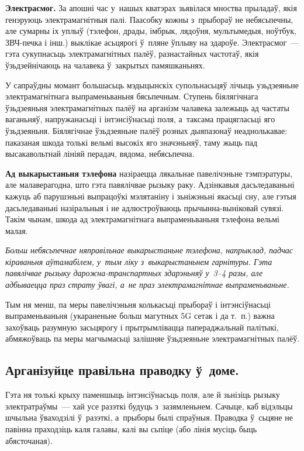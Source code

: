 \textbf{Электрасмог.} За апошні час у~нашых кватэрах зьявілася мноства прыладаў, якія генэруюць электрамагнітныя палі. Паасобку кожны з~прыбораў не небясьпечны, але сумарны іх уплыў (тэлефон, драды, імбрык, лядоўня, мультымедыя, ноўтбук, ЗВЧ-печка і інш.) выклікае асьцярогі ў~пляне ўплыву на здароўе. Электрасмог~--- гэта сукупнасьць электрамагнітных палёў, разнастайных частотаў, якія ўзьдзейнічаюць на чалавека ў~закрытых памяшканьнях.

У сапраўдны момант большасьць мэдыцынскіх супольнасьцяў лічыць узьдзеяньне электрамагнітнага выпраменьваньня бясьпечным. Ступень біялягічнага ўзьдзеяньня электрамагнітных палёў на арганізм чалавека залежыць ад частаты ваганьняў, напружанасьці і інтэнсіўнасьці поля, а~таксама працягласьці яго ўзьдзеяньня. Біялягічнае ўзьдзеяньне палёў розных дыяпазонаў неаднолькавае: паказаная шкода толькі вельмі высокіх яго значэньняў, таму жыць пад высакавольтнай лініяй перадач, вядома, небясьпечна.

\textbf{Ад выкарыстаньня тэлефона} назіраецца лякальнае павелічэньне тэмпэратуры, але малаверагодна, што гэта павялічвае рызыку раку. Адзінкавыя дасьледаваньні кажуць аб парушэньні выпрацоўкі мэлятаніну і зьніжэньні якасьці сну, але гэтыя дасьледаваньні назіральныя і не адлюстроўваюць прычынна-выніковай сувязі. Такім чынам, шкода ад электрамагнітнага выпраменьваньня тэлефона вельмі малая. 

\emph{Больш небясьпечнае няправільнае выкарыстаньне тэлефона, напрыклад, падчас кіраваньня аўтамабілем, у~тым ліку з~выкарыстаньнем гарнітуры. Гэта павялічвае рызыку дарожна-транспартных здарэньняў у~3--4 разы, але адбываецца праз страту ўвагі, а~не праз электрамагнітнае выпраменьваньне.}

Тым ня менш, па меры павелічэньня колькасьці прыбораў і інтэнсіўнасьці выпраменьваньня (укараненьне больш магутных 5G сетак і да т.~п.) важна захоўваць разумную засьцярогу і прытрымлівацца папераджальнай палітыкі, абмяжоўваць па меры магчымасьці залішняе ўзьдзеяньне электрамагнітных палёў.

\subsection*{Арганізуйце правільна праводку ў~доме.}

Гэта ня толькі крыху паменшыць інтэнсіўнасьць поля, але й зьнізіць рызыку электратраўмы~--- хай усе разэткі будуць з~зазямленьнем. Сачыце, каб відэльцы шчыльна ўваходзілі ў~разэткі, а~прыборы былі спраўныя. Праводка ў~сьцяне не павінна праходзіць каля галавы, калі вы сьпіце (або лінія мусіць быць абясточаная).

